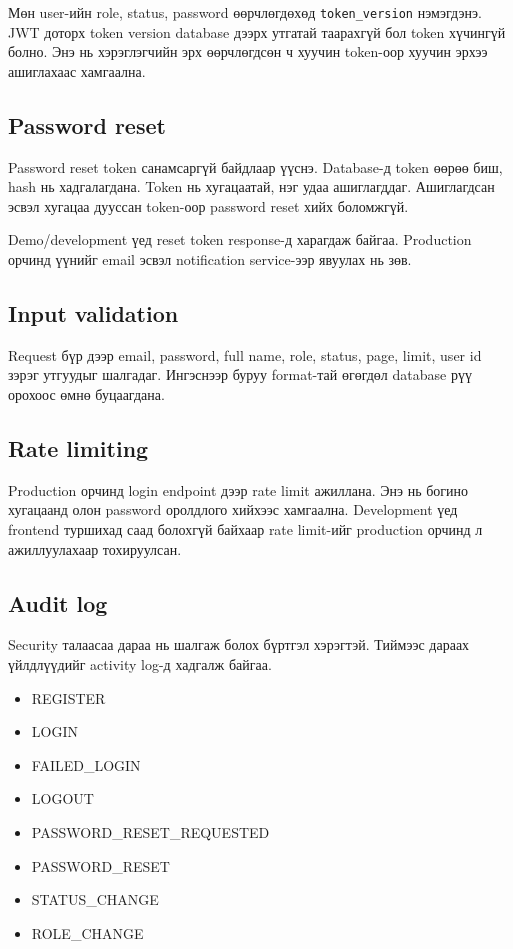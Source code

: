 \documentclass[12pt,a4paper]{article}
\begin{document}
Мөн user-ийн role, status, password өөрчлөгдөхөд \texttt{token\_version} нэмэгдэнэ. JWT доторх token version database дээрх утгатай таарахгүй бол token хүчингүй болно. Энэ нь хэрэглэгчийн эрх өөрчлөгдсөн ч хуучин token-оор хуучин эрхээ ашиглахаас хамгаална.

\subsection{Password reset}

Password reset token санамсаргүй байдлаар үүснэ. Database-д token өөрөө биш, hash нь хадгалагдана. Token нь хугацаатай, нэг удаа ашиглагддаг. Ашиглагдсан эсвэл хугацаа дууссан token-оор password reset хийх боломжгүй.

Demo/development үед reset token response-д харагдаж байгаа. Production орчинд үүнийг email эсвэл notification service-ээр явуулах нь зөв.

\subsection{Input validation}

Request бүр дээр email, password, full name, role, status, page, limit, user id зэрэг утгуудыг шалгадаг. Ингэснээр буруу format-тай өгөгдөл database рүү орохоос өмнө буцаагдана.

\subsection{Rate limiting}

Production орчинд login endpoint дээр rate limit ажиллана. Энэ нь богино хугацаанд олон password оролдлого хийхээс хамгаална. Development үед frontend туршихад саад болохгүй байхаар rate limit-ийг production орчинд л ажиллуулахаар тохируулсан.

\subsection{Audit log}

Security талаасаа дараа нь шалгаж болох бүртгэл хэрэгтэй. Тиймээс дараах үйлдлүүдийг activity log-д хадгалж байгаа.

\begin{itemize}
  \item REGISTER
  \item LOGIN
  \item FAILED\_LOGIN
  \item LOGOUT
  \item PASSWORD\_RESET\_REQUESTED
  \item PASSWORD\_RESET
  \item STATUS\_CHANGE
  \item ROLE\_CHANGE
\end{itemize}
\end{document}
